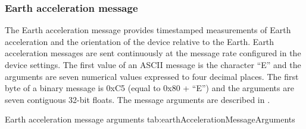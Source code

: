 \begingroup
    \def\tempNameA{Quaternion W element}
    \def\tempNameB{Quaternion X element}
    \def\tempNameC{Quaternion Y element}
    \def\tempNameD{Quaternion Z element}
    \def\tempNameE{Linear acceleration X axis}
    \def\tempNameF{Linear acceleration Y axis}
    \def\tempNameG{Linear acceleration Z axis}
    \def\tempValueA{1}
    \def\tempValueB{0}
    \def\tempValueC{0}
    \def\tempValueD{0}
    \def\tempValueE{0}
    \def\tempValueF{0}
    \def\tempValueG{0}
    \def\tempAsciiFirst{L}
    \def\tempAsciiA{1.0000}
    \def\tempAsciiB{0.0000}
    \def\tempAsciiC{0.0000}
    \def\tempAsciiD{0.0000}
    \def\tempAsciiE{0.0000}
    \def\tempAsciiF{0.0000}
    \def\tempAsciiG{0.0000}
    \def\tempBinaryFirst{CC}
    \def\tempBinaryA{00 00 80 3F}
    \def\tempBinaryB{00 00 00 00}
    \def\tempBinaryC{00 00 00 00}
    \def\tempBinaryD{00 00 00 00}
    \def\tempBinaryE{00 00 00 00}
    \def\tempBinaryF{00 00 00 00}
    \def\tempBinaryG{00 00 00 00}
    \dataMessageExample
\endgroup

\subsubsection{Earth acceleration message}

The Earth acceleration message provides timestamped measurements of Earth acceleration and the orientation of the device relative to the Earth.  Earth acceleration messages are sent continuously at the message rate configured in the device settings.  The first value of an \ac{ASCII} message is the character \enquote{E} and the arguments are seven numerical values expressed to four decimal places.  The first byte of a binary message is 0xC5 (equal to 0x80 + \enquote{E}) and the arguments are seven contiguous 32-bit floats.  The message arguments are described in .

\begingroup
    \def\tempArgumentA{Quaternion W element}
    \def\tempArgumentB{Quaternion X element}
    \def\tempArgumentC{Quaternion Y element}
    \def\tempArgumentD{Quaternion Z element}
    \def\tempArgumentE{Earth acceleration X axis in g}
    \def\tempArgumentF{Earth acceleration Y axis in g}
    \def\tempArgumentG{Earth acceleration Z axis in g}
    \def\tempCaption{Earth acceleration message arguments}
    \def\tempLabel{tab:earthAccelerationMessageArguments}
    \dataMessageTable
    {Earth acceleration message arguments}
    {tab:earthAccelerationMessageArguments}
\endgroup

